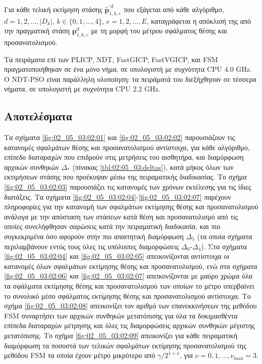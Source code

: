 Για κάθε τελική εκτίμηση στάσης $\hat{\bm{p}}_{1,k,e}^{\prime d}$ που εξάγεται
από κάθε αλγόριθμο, $d = 1,2,\dots,|D_k|$, $k \in \{0,1,\dots,4\}$,
$e=1,2,\dots,E$, καταγράφεται η απόκλισή της από την πραγματική στάση
$\bm{p}_{1,k,e}^d$ με τη μορφή του μέτρου σφάλματος θέσης και προσανατολισμού.

Τα πειράματα επί των  PLICP, NDT, FastGICP, FastVGICP, και FSM
πραγματοποιήθηκαν σε ένα μόνο νήμα, σε υπολογιστή με συχνότητα CPU $4.0$ GHz. Ο
NDT-PSO είναι παράλληλη υλοποίηση: τα πειράματά του διεξήχθησαν σε τέσσερα
νήματα, σε υπολογιστή με συχνότητα CPU $2.2$ GHz.




\subsection{Αποτελέσματα}
\label{subsection:02_05_03:02}

Τα σχήματα \ref{fig:02_05_03:02:01} και \ref{fig:02_05_03:02:02} παρουσιάζουν
τις κατανομές σφαλμάτων θέσης και προσανατολισμού αντίστοιχα, για κάθε
αλγόριθμο, επίπεδο διαταραχών που επιδρούν στις μετρήσεις του αισθητήρα, και
διαμόρφωση αρχικών συνθηκών $\Delta_\ast$ (πίνακας \ref{tbl:02:05_03:deltas}),
κατά μήκος όλων των εκτιμήσεων στάσης που προέκυψαν μέσω της πειραματικής
διαδικασίας. Το σχήμα \ref{fig:02_05_03:02:03} παρουσιάζει τις κατανομές των
χρόνων εκτέλεσης για τις ίδιες διατάξεις. Τα σχήματα
\ref{fig:02_05_03:02:04}-\ref{fig:02_05_03:02:07} παρέχουν πληροφορίες για την
κατανομή των σφαλμάτων εκτίμησης θέσης και προσανατολισμού ανάλογα με την
απόσταση των στάσεων κατά θέση και προσανατολισμό από τις οποίες συνελήφθησαν
σαρώσεις κατά την πειραματική διαδικασία, και πιο συγκεκριμένα όσο αφορούν στην
πιο απαιτητική διαμόρφωση $\Delta_5$ (τα οποία σχήματα περιλαμβάνουν εντός τους
όλες τις υπόλοιπες διαμορφώσεις $\Delta_0$-$\Delta_4$). Στα σχήματα
\ref{fig:02_05_03:02:04} και \ref{fig:02_05_03:02:05} απεικονίζονται αντίστοιχα
οι κατανομές όλων σφαλμάτων εκτίμησης θέσης και προσανατολισμού, ενώ στα
σχήματα \ref{fig:02_05_03:02:06} και \ref{fig:02_05_03:02:07} απεικονίζονται με
μαύρο χρώμα όλα τα σφάλματα εκτίμησης θέσης και προσανατολισμού των οποίων το
μέτρο υπερβαίνει το συνολικό μέσο σφάλματος εκτίμησης θέσης και προσανατολισμού
αντίστοιχα. Το σχήμα \ref{fig:02_05_03:02:08} απεικονίζει τον αριθμό των
επανεκκινήσεων της μεθόδου FSM συναρτήσει των αρχικών συνθηκών μετατόπισης για
όλα τα δοκιμασθέντα επίπεδα διαταραχών μέτρησης και όλες τις διαμορφώσεις
αρχικών συνθηκών μέγιστης μετατόπισης. Το σχήμα \ref{fig:02_05_03:02:09}
απεικονίζει για κάθε πειραματική διαμόρφωση τα ποσοστά των τελικών σφαλμάτων
εκτίμησης προσανατολισμού της μεθόδου FSM τα οποία έχουν μέτρο μικρότερο από
$\gamma/2^{1+\nu}$, για $\nu = 0, 1, \dots, \nu_{\max} = 3$.

